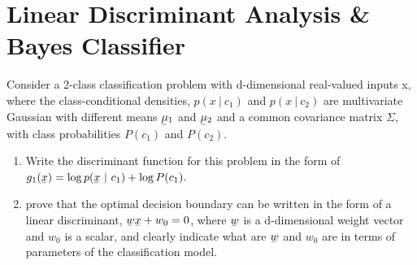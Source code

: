 \documentclass[12pt]{article}
\numberwithin{equation}{section}
\numberwithin{table}{section}
\numberwithin{figure}{section}
\begin{document}
\section{Linear Discriminant Analysis \& Bayes Classifier}
Consider a 2-class classification problem with d-dimensional real-valued inputs x, where the class-conditional densities, $p(x\ |\ c_1)$ and $p(x\ |\ c_2)$ are multivariate Gaussian with different means $\underaccent{\bar}{\mu}_1$ and $\underaccent{\bar}{\mu}_2$ and a common covariance matrix $\Sigma$, with class probabilities $P(c_1)$ and $P(c_2)$.
\begin{enumerate}[label=(\alph*)]
	\item Write the discriminant function for this problem in the form of $g_1(\underaccent{\bar}{x}) = \log p(\underaccent{\bar}{x}\ |\ c_1) + \log P(c_1).$
	
	\item prove that the optimal decision boundary can be written in the form of a linear discriminant, $\underaccent{\bar}{w}\underaccent{\bar}{x} + w_0 = 0$, where $\underaccent{\bar}{w}$ is a d-dimensional weight vector and $w_0$ is a scalar, and clearly indicate what are $\underaccent{\bar}{w}$ and $w_0$ are in terms of parameters of the classification model.
\end{enumerate}
\end{document}
